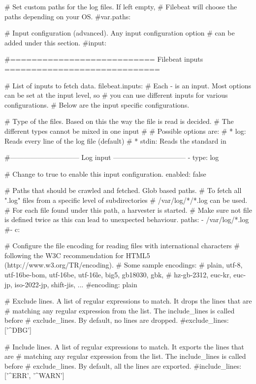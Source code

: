     # Set custom paths for the log files. If left empty,
    # Filebeat will choose the paths depending on your OS.
    #var.paths:

    # Input configuration (advanced). Any input configuration option
    # can be added under this section.
    #input:


#=========================== Filebeat inputs =============================

# List of inputs to fetch data.
filebeat.inputs:
# Each - is an input. Most options can be set at the input level, so
# you can use different inputs for various configurations.
# Below are the input specific configurations.

# Type of the files. Based on this the way the file is read is decided.
# The different types cannot be mixed in one input
#
# Possible options are:
# * log: Reads every line of the log file (default)
# * stdin: Reads the standard in

#------------------------------ Log input --------------------------------
- type: log

  # Change to true to enable this input configuration.
  enabled: false

  # Paths that should be crawled and fetched. Glob based paths.
  # To fetch all ".log" files from a specific level of subdirectories
  # /var/log/*/*.log can be used.
  # For each file found under this path, a harvester is started.
  # Make sure not file is defined twice as this can lead to unexpected behaviour.
  paths:
    - /var/log/*.log
    #- c:\programdata\elasticsearch\logs\*

  # Configure the file encoding for reading files with international characters
  # following the W3C recommendation for HTML5 (http://www.w3.org/TR/encoding).
  # Some sample encodings:
  #   plain, utf-8, utf-16be-bom, utf-16be, utf-16le, big5, gb18030, gbk,
  #    hz-gb-2312, euc-kr, euc-jp, iso-2022-jp, shift-jis, ...
  #encoding: plain


  # Exclude lines. A list of regular expressions to match. It drops the lines that are
  # matching any regular expression from the list. The include_lines is called before
  # exclude_lines. By default, no lines are dropped.
  #exclude_lines: ['^DBG']

  # Include lines. A list of regular expressions to match. It exports the lines that are
  # matching any regular expression from the list. The include_lines is called before
  # exclude_lines. By default, all the lines are exported.
  #include_lines: ['^ERR', '^WARN']

